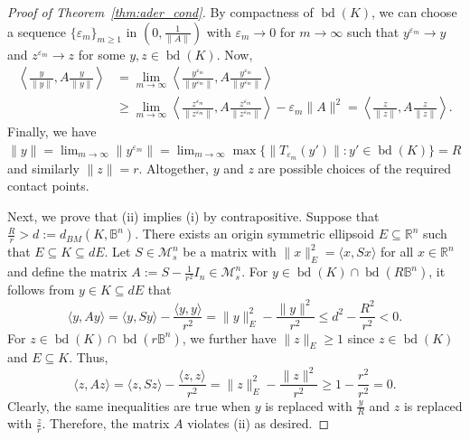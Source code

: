 \documentclass[12pt,a4paper]{article}
\theoremstyle{definition}
\DeclareMathOperator{\bd}{bd}
\newcommand\R{\mathbb{R}}
\newcommand\B{\mathbb{B}}
\newcommand\ms[1]{\mathcal{M}_s^{#1}}
\begin{document}
\begin{proof}[Proof of Theorem~\ref{thm:ader_cond}]
By compactness of $\bd(K)$, we can choose a sequence $\{ \varepsilon_m \}_{m \geq 1}$ in $\left( 0,\frac{1}{\|A\|} \right)$ with $\varepsilon_m \to 0$ for $m \to \infty$ such that $y^{\varepsilon_m} \to y$ and $z^{\varepsilon_m} \to z$ for some $y,z \in \bd(K)$. Now,
\begin{align*}
\left\langle \frac{y}{\|y\|}, A \frac{y}{\|y\|} \right\rangle
& = \lim_{m \to \infty} \left\langle \frac{y^{\varepsilon_m}}{\|y^{\varepsilon_m}\|}, A \frac{y^{\varepsilon_m}}{\|y^{\varepsilon_m}\|} \right\rangle
\\
& \geq \lim_{m \to \infty} \left\langle \frac{z^{\varepsilon_m}}{\|z^{\varepsilon_m}\|}, A \frac{z^{\varepsilon_m}}{\|z^{\varepsilon_m}\|} \right\rangle - \varepsilon_m \|A\|^2
= \left\langle \frac{z}{\|z\|}, A \frac{z}{\|z\|} \right\rangle.
\end{align*}
Finally, we have $\|y\| = \lim_{m \to \infty} \|y^{\varepsilon_m}\| = \lim_{m \to \infty} \max \{ \|T_{\varepsilon_m}(y')\| : y' \in \bd(K) \} = R$ and similarly $\|z\| = r$. Altogether, $y$ and $z$ are possible choices of the required contact points.

Next, we prove that (ii) implies (i) by contrapositive. Suppose that $\frac{R}{r} > d :=d_{BM}(K, \B^n)$. There exists an origin symmetric ellipsoid $E \subseteq \R^n$ such that $E \subseteq K \subseteq d E$. Let $S \in \ms{n}$ be a matrix with $\|x\|_E^2 = \langle x, S x \rangle$ for all $x \in \R^n$ and define the matrix $A := S - \frac{1}{r^2} I_n \in \ms{n}$. For $y \in \bd(K) \cap \bd(R\B^n)$, it follows from $y \in K \subseteq d E$ that $$ \langle y, A y \rangle = \langle y, S y \rangle - \frac{\langle y, y \rangle}{r^2} = \|y\|_E^2 - \frac{\|y\|^2}{r^2} \leq d^2 - \frac{R^2}{r^2} < 0. $$ For $z \in \bd(K) \cap \bd(r \B^n)$, we further have $\|z\|_E \geq 1$ since $z \in \bd(K)$ and $E \subseteq K$. Thus,
$$ \langle z, A z \rangle = \langle z, S z \rangle - \frac{\langle z, z \rangle}{r^2} = \|z\|_E^2 - \frac{\|z\|^2}{r^2} \geq 1 - \frac{r^2}{r^2}=0.$$
Clearly, the same inequalities are true when $y$ is replaced with $\frac{y}{R}$ and $z$ is replaced with $\frac{z}{r}$. Therefore, the matrix $A$ violates (ii) as desired.


\end{proof}
\end{document}
